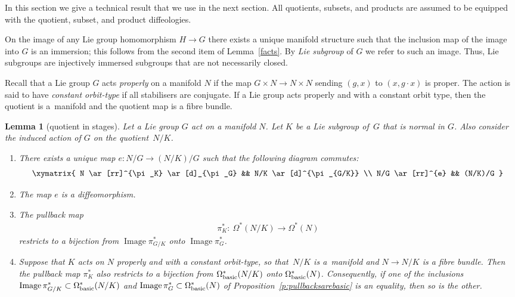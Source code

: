 \documentclass[11pt]{article}
\numberwithin{equation}{section}
\newtheorem{Lemma}[Theorem]{Lemma}
\DeclareMathOperator {\image}{Image}
\begin{document}
In this section we give a technical result that we use in the next section.
All quotients, subsets, and products are assumed to be equipped
with the quotient, subset, and product dif\/feologies.

On the image of any Lie group homomorphism $H \to G$
there exists a unique manifold structure
such that the inclusion map of the image into $G$ is an immersion;
this follows from the second item of Lemma~\ref{facts}.
By \emph{Lie subgroup} of $G$ we refer to such an image.
Thus, Lie subgroups are injectively immersed subgroups
that are not necessarily closed.

Recall that a Lie group $G$ acts \emph{properly} on a manifold $N$
if the map $G\times N\to N\times N$ sending $(g,x)$ to $(x,g\cdot x)$
is proper. The action is said to have \emph{constant orbit-type}
if all stabilisers are conjugate.
If a Lie group acts properly and with a constant orbit type,
then the quotient is a~mani\-fold and the quotient map is a f\/ibre bundle.

\begin{Lemma}[quotient in stages] \label{l:q in stages}
Let a Lie group $G$ act on a manifold $N$.
Let $K$ be a Lie subgroup of~$G$
that is normal in $G$.
Also consider the induced action of $G$ on the quotient~$N/K$.
\begin{enumerate}\itemsep=0pt
\item[$(i)$]
There exists a unique map $ e \colon N/G \to (N/K) / G $
such that the following diagram commutes:
\begin{gather} \label{diagram q in stages}
\begin{split}
   \xymatrix{
 N \ar[rr]^{\pi_K} \ar[d]_{\pi_G} && N/K \ar[d]^{\pi_{G/K}} \\
 N/G \ar[rr]^{e} &&  (N/K)/G
}
\end{split}
\end{gather}

\item[$(ii)$]
The map $e$ is a diffeomorphism.

\item[$(iii)$]
The pullback map
\begin{gather*} \pi_K^* \colon \ \Omega^*(N/K) \to \Omega^*(N) \end{gather*}
restricts to a bijection from $\image \pi_{G/K}^*$ onto $\image \pi_G^*$.

\item[$(iv)$]
Suppose that $K$ acts on $N$ properly and with a constant orbit-type,
so that~$N/K$ is a~mani\-fold and $N \to N/K$ is a fibre bundle.
Then the pullback map $\pi_K^*$ also restricts to a bijection
from $\Omega^*_{\rm basic}(N/K)$ onto $\Omega^*_{\rm basic}(N)$.
Consequently, if one of the inclusions
$\image \pi_{G/K}^* \subset \Omega^*_{\rm basic}(N/K)$
and
$\image \pi_G^* \subset \Omega^*_{\rm basic}(N)$
of Proposition~{\rm \ref{p:pullbacksarebasic}} is an equality,
then so is the other.
\end{enumerate}
\end{Lemma}
\end{document}
